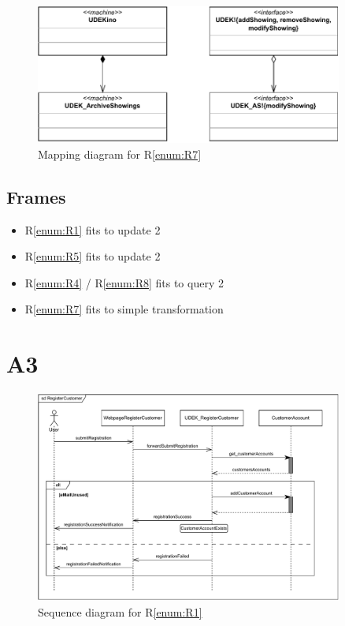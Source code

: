 \documentclass[a4paper,10pt,titlepage,bibtotoc,bibtotocnumbered]{scrreprt}
\begin{document}
\begin{figure}[H]
\centering
\includegraphics[width=0.9\textwidth]{figures/04/a04_problem_diagram_4-Mapping.pdf}
\caption{Mapping diagram for R\ref{enum:R7}}
\label{figure:mdR7}
\end{figure}

\subsection*{Frames}
\begin{itemize}
    \item R\ref{enum:R1} fits to update 2
    \item R\ref{enum:R5} fits to update 2
    \item R\ref{enum:R4} / R\ref{enum:R8} fits to query 2
    \item R\ref{enum:R7} fits to simple transformation
\end{itemize}

\newpage\section{A3}

\begin{figure}[H]
    \centering
    \includegraphics[width=0.9\textwidth]{figures/05/a05_sequence_diagram_r01.pdf}
    \caption{Sequence diagram for R\ref{enum:R1}}
    \label{figure:sdR1}
\end{figure}
\end{document}

